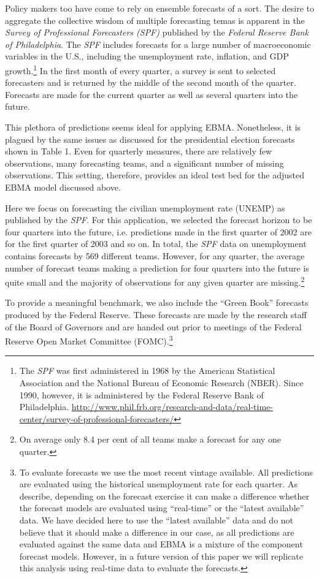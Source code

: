 \documentclass[12pt,fullpage,endnotes]{article}
\begin{document}
Policy makers too have come to rely on ensemble forecasts of a sort.
The desire to aggregate the collective wisdom of multiple forecasting
temas is apparent in the \textit{Survey of Professional Forecasters
  (SPF)} published by the \textit{Federal Reserve Bank of
  Philadelphia}.  The \textit{SPF} includes forecasts for a large
number of macroeconomic variables in the U.S., including the
unemployment rate, inflation, and GDP growth.\footnote{The
  \textit{SPF} was first administered in 1968 by the American
  Statistical Association and the National Bureau of Economic Research
  (NBER).  Since 1990, however, it is administered by the Federal
  Reserve Bank of Philadelphia.
  \url{http://www.phil.frb.org/research-and-data/real-time-center/survey-of-professional-forecasters/}}
In the first month of every quarter, a survey is sent to selected
forecasters and is returned by the middle of the second month of the
quarter. Forecasts are made for the current quarter as well as several
quarters into the future.

This plethora of predictions seems ideal for applying EBMA.  Nonetheless,
it is plagued by the same issues as discussed for the presidential
election forecasts shown in Table 1.  Even for quarterly measures,
there are relatively few observations, many forecasting teams, and a
significant number of missing observations.  This setting, therefore,
provides an ideal test bed for the adjusted EBMA model discussed
above.

Here we focus on forecasting the civilian unemployment rate (UNEMP) as
published by the \textit{SPF}. For this application, we selected the
forecast horizon to be four quarters into the future, i.e. predictions
made in the first quarter of 2002 are for the first quarter of 2003
and so on. In total, the \textit{SPF} data on unemployment contains
forecasts by 569 different teams. However, for any quarter, the
average number of forecast teams making a prediction for four quarters
into the future is quite small and the majority of observations for
any given quarter are missing.\footnote{On average only 8.4 per cent
  of all teams make a forecast for any one quarter.}

To provide a meaningful benchmark, we also include the ``Green Book''
forecasts produced by the Federal Reserve. These forecasts are made by
the research staff of the Board of Governors and are handed out prior
to meetings of the Federal Reserve Open Market Committee
(FOMC).\footnote{To evaluate forecasts we use the most recent vintage
  available. All predictions are evaluated using the historical
  unemployment rate for each quarter. As \citet{Croushore:Stark:2001}
  describe, depending on the forecast exercise it can make a
  difference whether the forecast models are evaluated using
  ``real-time'' or the ``latest available'' data. We have decided here
  to use the ``latest available'' data and do not believe that it
  should make a difference in our case, as all predictions are
  evaluated against the same data and EBMA is a mixture of the
  component forecast models. However, in a future version of this
  paper we will replicate this analysis using real-time data to
  evaluate the forecasts.} %
\end{document}
